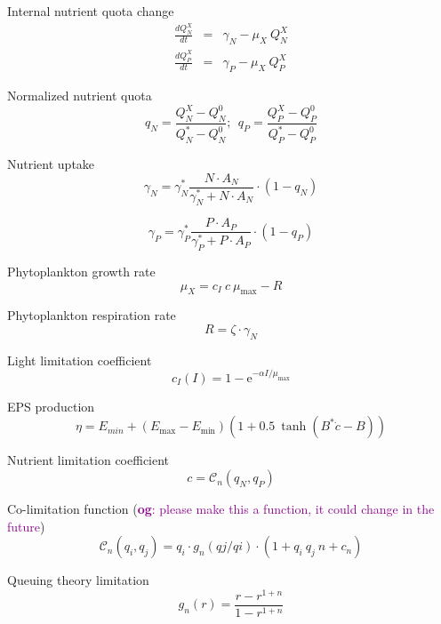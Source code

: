 \documentclass[fleqn]{article}                     %
\newcommand{\comment}[3][darkmagenta]{\textcolor{#1}{\textbf{#2}: #3}}
\begin{document}
Internal nutrient quota change
\begin{eqnarray}
  \frac{dQ^X_N}{dt} &=&  \gamma_N - \mu_X \  Q^X_N \\
  \frac{dQ^X_P}{dt} &=&  \gamma_P- \mu_X \  Q^X_P
\end{eqnarray}

Normalized nutrient quota
\begin{equation}
  q_N = \frac{Q^X_N-Q^0_N}{Q^*_N-Q^0_N};\ \ q_P = \frac{Q^X_P-Q^0_P}{Q^*_P-Q^0_P}
\end{equation}

Nutrient uptake
\begin{equation}
  \gamma_N = \gamma^*_N \frac{N \cdot A_N}{\gamma^*_N+ N \cdot A_N} \cdot (1-q_N)
\end{equation}

\begin{equation}
  \gamma_P = \gamma^*_P \frac{P \cdot A_P}{\gamma^*_P + P \cdot A_P} \cdot (1-q_P)
\end{equation}

Phytoplankton growth rate
\begin{equation}
  \mu_X= c_I\  c\  \mu_{\text{max}} - R
\end{equation}

Phytoplankton respiration rate
\begin{equation}
  R = \zeta \cdot \gamma_N
\end{equation}

Light limitation coefficient
\begin{equation}
  c_I(I) = 1-\textrm{e}^{-\alpha I/ \mu_{\text{max}}}
\end{equation}

EPS production
\begin{equation}
  \eta = E_{min} + (E_{\textrm{max}}-E_{\textrm{min}})(1+0.5\ \tanh(B^*\dot{c}-B))
\end{equation}

Nutrient limitation coefficient
\begin{equation}
  c = \mathcal{C}_n(q_N,q_P)
\end{equation}

Co-limitation function (\comment{og}{please make this a function, it could change in the future})
\begin{equation}
  \mathcal{C}_n(q_i, q_j) = q_i \cdot g_n(qj/qi) \cdot (1 + q_i\ q_j\ n + c_n)
\end{equation}

Queuing theory limitation
\begin{equation}
  g_n(r) = \frac{r - r^{1+n}}{1 - r^{1+n}}
\end{equation}
\end{document}
